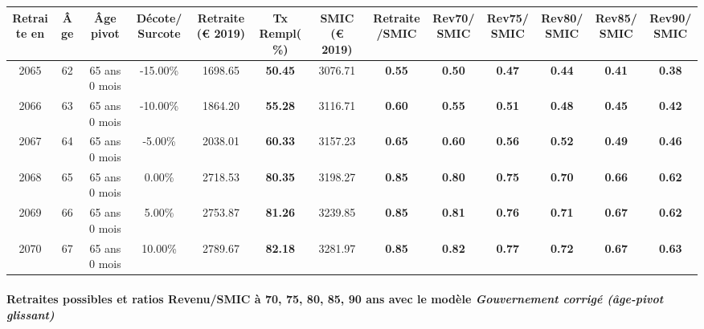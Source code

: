 { \scriptsize \begin{center} 
\begin{tabular}[htb]{|c|c||c|c||c|c||c||c|c|c|c|c|c|} 
\hline 
 Retraite en &  Âge &  Âge pivot &  Décote/Surcote &  Retraite (\euro{} 2019) &  Tx Rempl(\%) &  SMIC (\euro{} 2019) &  Retraite/SMIC &  Rev70/SMIC &  Rev75/SMIC &  Rev80/SMIC &  Rev85/SMIC &  Rev90/SMIC \\ 
\hline \hline 
 2065 &  62 &  65 ans 0 mois &  -15.00\% &  1698.65 &  {\bf 50.45} &  3076.71 &  {\bf {\color{red} 0.55}} &  {\bf {\color{red} 0.50}} &  {\bf {\color{red} 0.47}} &  {\bf {\color{red} 0.44}} &  {\bf {\color{red} 0.41}} &  {\bf {\color{red} 0.38}} \\ 
\hline 
 2066 &  63 &  65 ans 0 mois &  -10.00\% &  1864.20 &  {\bf 55.28} &  3116.71 &  {\bf {\color{red} 0.60}} &  {\bf {\color{red} 0.55}} &  {\bf {\color{red} 0.51}} &  {\bf {\color{red} 0.48}} &  {\bf {\color{red} 0.45}} &  {\bf {\color{red} 0.42}} \\ 
\hline 
 2067 &  64 &  65 ans 0 mois &  -5.00\% &  2038.01 &  {\bf 60.33} &  3157.23 &  {\bf {\color{red} 0.65}} &  {\bf {\color{red} 0.60}} &  {\bf {\color{red} 0.56}} &  {\bf {\color{red} 0.52}} &  {\bf {\color{red} 0.49}} &  {\bf {\color{red} 0.46}} \\ 
\hline 
 2068 &  65 &  65 ans 0 mois &  0.00\% &  2718.53 &  {\bf 80.35} &  3198.27 &  {\bf {\color{red} 0.85}} &  {\bf {\color{red} 0.80}} &  {\bf {\color{red} 0.75}} &  {\bf {\color{red} 0.70}} &  {\bf {\color{red} 0.66}} &  {\bf {\color{red} 0.62}} \\ 
\hline 
 2069 &  66 &  65 ans 0 mois &  5.00\% &  2753.87 &  {\bf 81.26} &  3239.85 &  {\bf {\color{red} 0.85}} &  {\bf {\color{red} 0.81}} &  {\bf {\color{red} 0.76}} &  {\bf {\color{red} 0.71}} &  {\bf {\color{red} 0.67}} &  {\bf {\color{red} 0.62}} \\ 
\hline 
 2070 &  67 &  65 ans 0 mois &  10.00\% &  2789.67 &  {\bf 82.18} &  3281.97 &  {\bf {\color{red} 0.85}} &  {\bf {\color{red} 0.82}} &  {\bf {\color{red} 0.77}} &  {\bf {\color{red} 0.72}} &  {\bf {\color{red} 0.67}} &  {\bf {\color{red} 0.63}} \\ 
\hline 
\hline 
\end{tabular} 
\end{center} } 
\paragraph{Retraites possibles et ratios Revenu/SMIC à 70, 75, 80, 85, 90 ans avec le modèle \emph{Gouvernement corrigé (âge-pivot glissant)}}  
 

